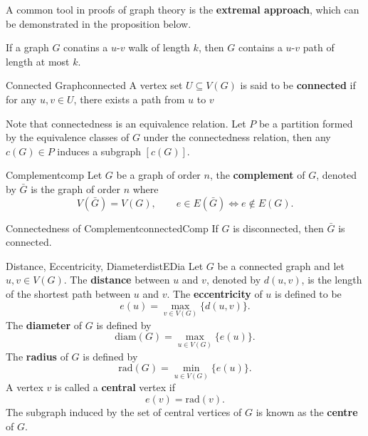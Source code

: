 \documentclass[math]{amznotes}
\theoremstyle{remark}
\begin{document}
A common tool in proofs of graph theory is the \textbf{extremal approach}, which can be demonstrated in the proposition below.
\begin{probox}{}{}
    If a graph $G$ conatins a $u$-$v$ walk of length $k$, then $G$ contains a $u$-$v$ path of length at most $k$.
\end{probox}
\begin{dfnbox}{Connected Graph}{connected}
    A vertex set $U \subseteq V(G)$ is said to be {\color{red} \textbf{connected}} if for any $u, v \in U$, there exists a path from $u$ to $v$
\end{dfnbox}
Note that connectedness is an equivalence relation. Let $P$ be a partition formed by the equivalence classes of $G$ under the connectedness relation, then any $c(G) \in P$ induces a subgraph $[c(G)]$.
\begin{dfnbox}{Complement}{comp}
    Let $G$ be a graph of order $n$, the {\color{red} \textbf{complement}} of $G$, denoted by $\bar{G}$ is the graph of order $n$ where
    \begin{equation*}
        V(\bar{G}) = V(G), \qquad e \in E(\bar{G}) \iff e \notin E(G).
    \end{equation*}
\end{dfnbox}
\begin{thmbox}{Connectedness of Complement}{connectedComp}
    If $G$ is disconnected, then $\bar{G}$ is connected.
\end{thmbox}
\begin{dfnbox}{Distance, Eccentricity, Diameter}{distEDia}
    Let $G$ be a connected graph and let $u, v \in V(G)$. The {\color{red} \textbf{distance}} between $u$ and $v$, denoted by $d(u, v)$, is the length of the shortest path between $u$ and $v$. The {\color{red} \textbf{eccentricity}} of $u$ is defined to be
    \begin{equation*}
        e(u) = \max_{v \in V(G)}\{d(u, v)\}.
    \end{equation*}
    The {\color{red} \textbf{diameter}} of $G$ is defined by
    \begin{equation*}
        \mathrm{diam}(G) = \max_{u \in V(G)}\{e(u)\}.
    \end{equation*}
    The {\color{red} \textbf{radius}} of $G$ is defined by
    \begin{equation*}
        \mathrm{rad}(G) = \min_{u \in V(G)}\{e(u)\}.
    \end{equation*}
    A vertex $v$ is called a {\color{red} \textbf{central}} vertex if
    \begin{equation*}
        e(v) = \mathrm{rad}(v).
    \end{equation*}
    The subgraph induced by the set of central vertices of $G$ is known as the {\color{red} \textbf{centre}} of $G$.
\end{dfnbox}
\end{document}
